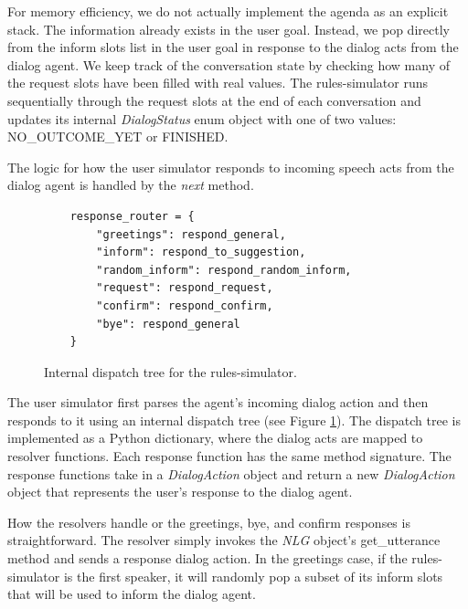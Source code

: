 For memory efficiency, we do not actually implement the agenda as an explicit stack. The information already exists in the user goal. Instead, we pop directly from the inform slots list in the user goal in response to the dialog acts from the dialog agent. We keep track of the conversation state by checking how many of the request slots have been filled with real values. The rules-simulator runs sequentially through the request slots at the end of each conversation and updates its internal\textit{ DialogStatus} enum object with one of two values: NO\_OUTCOME\_YET or FINISHED.

The logic for how the user simulator responds to incoming speech acts from the dialog agent is handled by the \textit{next} method. 

\begin{figure}[h!]
	\label{fig:dispatch_tree}
	\begin{lstlisting}
	response_router = { 
		"greetings": respond_general,
		"inform": respond_to_suggestion,
		"random_inform": respond_random_inform,
		"request": respond_request,
		"confirm": respond_confirm,
		"bye": respond_general
	}	
	\end{lstlisting}
	\caption{ Internal dispatch tree for the rules-simulator. }
\end{figure}

The user simulator first parses the agent's incoming dialog action and then responds to it using an internal dispatch tree (see Figure \ref{fig:dispatch_tree}). The dispatch tree is implemented as a Python dictionary, where the dialog acts are mapped to resolver functions. Each response function has the same method signature.  The response functions take in a \textit{DialogAction} object and return a new \textit{DialogAction} object that represents the user's response to the dialog agent. 
 
How the resolvers handle or the greetings, bye, and confirm responses is straightforward. The resolver simply invokes the \textit{NLG} object's get\_utterance method and sends a response dialog action. In the greetings case, if the rules-simulator is the first speaker, it will randomly pop a subset of its inform slots that will be used to inform the dialog agent. 

